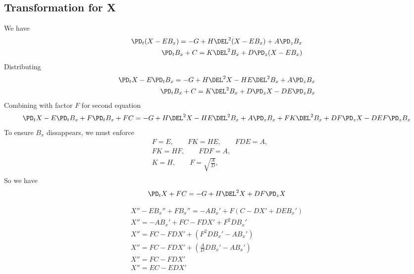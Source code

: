 \documentclass[11pt]{article}
\begin{document}
\subsection{Transformation for X}
We have
\begin{equation}\begin{aligned}
\PD_t (X - E B_x)        = -G+ H \DEL^2 (X - E B_x) + A \PD_z B_x \\
\PD_t B_x + C = K \DEL^2 B_x + D \PD_z (X - E B_x) \\
\end{aligned} \end{equation}
Distributing
\begin{equation}\begin{aligned}
\PD_t X - E \PD_t B_x = -G+ H \DEL^2 X - H E \DEL^2 B_x + A \PD_z B_x \\
\PD_t B_x + C = K \DEL^2 B_x + D \PD_z X - D E \PD_z B_x \\
\end{aligned} \end{equation}
Combining with factor $F$ for second equation
\begin{equation}\begin{aligned}
\PD_t X - E \PD_t B_x + F \PD_t B_x + FC = -G+ H \DEL^2 X - H E \DEL^2 B_x + A \PD_z B_x + F K \DEL^2 B_x + DF \PD_z X - D EF \PD_z B_x\\
\end{aligned} \end{equation}
To ensure $B_x$ dissappears, we must enforce
\begin{equation}\begin{aligned}
F = E, \qquad
FK = HE, \qquad
FDE = A, \qquad \\
FK = HF, \qquad
FDF = A, \qquad \\
K = H, \qquad
F = \sqrt{\frac{A}{D}}, \qquad \\
\end{aligned} \end{equation}
So we have
\begin{equation}\begin{aligned}
\PD_t X + FC = -G+ H \DEL^2 X + DF \PD_z X\\
\end{aligned} \end{equation}

\begin{equation}\begin{aligned}
X'' - E B_x'' + FB_x''   = - A B_x' + F(C - D X' + D E B_x') \\
X'' = - A B_x' + FC - FD X' + F^2 D B_x' \\
X'' = FC - FD X' + (F^2 D B_x' - A B_x') \\
X'' = FC - FD X' + \left(\frac{A}{D} D B_x' - A B_x' \right) \\
X'' = FC - FD X' \\
X'' = EC - ED X' \\
\end{aligned} \end{equation}
\end{document}
